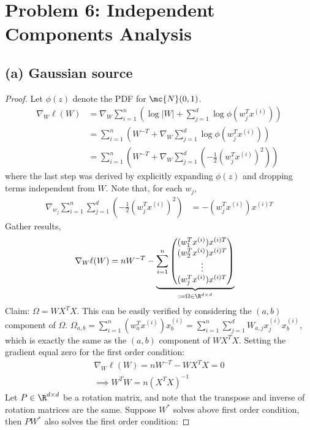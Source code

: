 \documentclass[11pt]{article}
\newcommand{\upi}[0]{^{(i)}}
\begin{document}
	\section{Problem 6: Independent Components Analysis}
	\subsection{(a) Gaussian source}
	\begin{proof}
		Let $\phi(z)$ denote the PDF for $\mc{N}(0, 1)$.
		\begin{align}
			\nabla_W \ell(W) &= \nabla_W \sum_{i=1}^n \left(
			\log |W| + \sum_{j=1}^d \log \phi(w_j^T x\upi)
			\right) \\
			&= \sum_{i=1}^n \left(
			W^{-T} + \nabla_W \sum_{j=1}^d \log \phi (w_j^T x\upi)
			\right) \\
			&= \sum_{i=1}^n \left(
			W^{-T} + \nabla_W \sum_{j=1}^d \left (
			- \frac{1}{2} (w_j^T x\upi)^2
			\right)
			\right)
		\end{align}
		where the last step was derived by explicitly expanding $\phi(z)$ and dropping terms independent from $W$. Note that, for each $w_j$,
		\begin{align}
			\nabla_{w_j} \sum_{i=1}^n \sum_{j=1}^d \left (
			- \frac{1}{2} (w_j^T x\upi)^2 \right) &= - (w_j^T x\upi) x^{(i)T}
		\end{align}
		Gather results,
		\begin{align}
			\nabla_W \ell(W) &= n W^{-T} - \underbrace{\sum_{i=1}^n
			\begin{pmatrix}
				(w_1^T x\upi) x^{(i)T} \\
				(w_2^T x\upi) x^{(i)T} \\
				\vdots \\
				(w_j^T x\upi) x^{(i)T}
			\end{pmatrix}}_{:= \Omega \in \R^{d \times d}}
		\end{align}
		Claim: $\Omega = W X^T X$. This can be easily verified by considering the $(a, b)$ component of $\Omega$. $\Omega_{a, b} = \sum_{i=1}^n (w_a^T x\upi) x\upi_b = \sum_{i=1}^n \sum_{j=1}^d W_{a, j} x\upi_j x\upi_b$, which is exactly the same as  the $(a, b)$ component of $WX^TX$. Setting the gradient equal zero for the first order condition:
		\begin{align}
			\nabla_W \ell(W) = n W^{-T} - W X^T X =0 \\
			\implies W^T W = n \left(X^T X \right)^{-1}
		\end{align}
		Let $P \in \R^{d\times d}$ be a rotation matrix, and note that the transpose and inverse of rotation matrices are the same. Suppose $W^*$ solves above first order condition, then $P W^*$ also solves the first order condition:

\end{proof}
\end{document}
